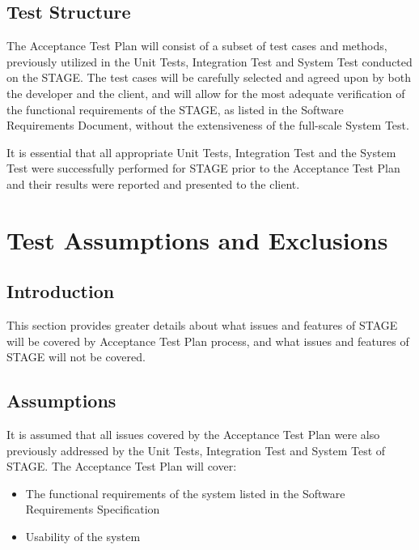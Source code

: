\documentclass[titlepage]{article}
\begin{document}

\subsection{Test Structure%
    \label{structure}%
}
    The Acceptance Test Plan will consist of a subset of test cases and methods, previously utilized in the Unit Tests, Integration Test and System Test conducted on the STAGE. The test cases will be carefully selected and agreed upon by both the developer and the client, and will allow for the most adequate verification of the functional requirements of the STAGE, as listed in the Software Requirements Document, without the extensiveness of the full-scale System Test.

    It is essential that all appropriate Unit Tests, Integration Test and the System Test were successfully performed for STAGE prior to the Acceptance Test Plan and their results were reported and presented to the client.


\section{Test Assumptions and Exclusions%
    \label{assumptions}%
}


\subsection{Introduction}
    This section provides greater details about what issues and features of STAGE will be covered by Acceptance Test Plan process, and what issues and features of STAGE will not be covered.


\subsection{Assumptions}
    It is assumed that all issues covered by the Acceptance Test Plan were also previously addressed by the Unit Tests, Integration Test and System Test of STAGE. The Acceptance Test Plan will cover:
    \begin{itemize}
        \item The functional requirements of the system listed in the Software Requirements Specification
        \item Usability of the system
    \end{itemize}
\end{document}
